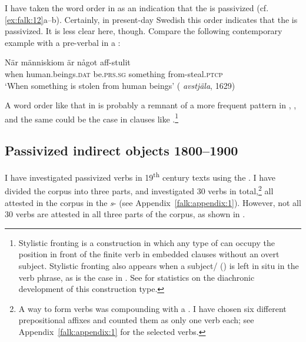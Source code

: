 \documentclass[output=paper]{langscibook}
\begin{document}
I have taken the word order in  as an indication that the  is passivized (cf. \ref{ex:falk:12}a–b). Certainly, in present-day Swedish this order indicates that the  is passivized. It is less clear here, though. Compare the following contemporary example with a pre-verbal   in a :\largerpage

\ea%
    \label{ex:falk:18}
\gll När  människiom      är        något      aff-stulit\\
    when  human.beings\textsc{.dat}  be.\textsc{prs.sg}  something  from-steal.\textsc{ptcp}\\
\glt ‘When something is stolen from human beings’ ( \textit{avstjäla}, 1629)
\z


A word order like that in  is probably a remnant of a more frequent pattern in , , and the same could be the case in clauses like .\footnote{Stylistic fronting is a construction in which any type of  can occupy the position in front of the finite verb in embedded clauses without an overt subject. Stylistic fronting also appears when a subject/ () is left in situ in the verb phrase, as is the case in . See \citet[326]{Falk1993} for statistics on the diachronic development of this construction type.}

\subsection{Passivized indirect objects 1800–1900}\label{sec:falk:3.5}


I have investigated passivized  verbs in 19\textsuperscript{th} century texts using the . I have divided the corpus into three parts, and investigated 30  verbs in total,\footnote{A  way to form  verbs was compounding with a . I have chosen six different prepositional affixes and counted them as only one verb each; see Appendix~\ref{falk:appendix:1} for the selected verbs.\label{fn:02:15}} all attested in the corpus in the \textit{s}{}- (see Appendix~\ref{falk:appendix:1}). However, not all 30 verbs are attested in all three parts of the corpus, as shown in .
\end{document}
